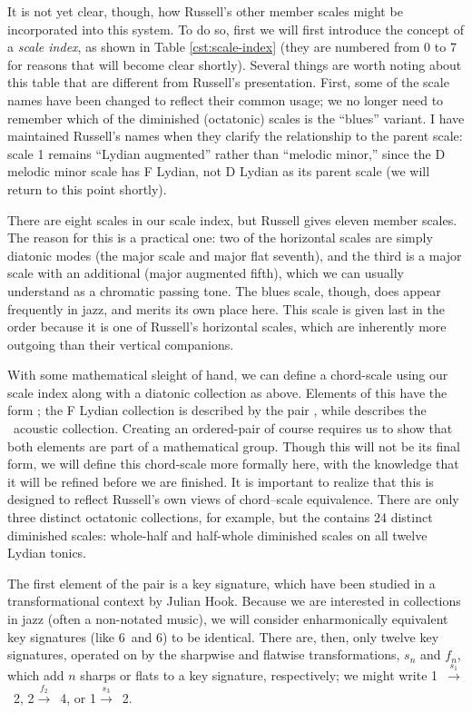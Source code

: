 It is not yet clear, though, how Russell's other member scales might be
incorporated into this system. To do so, first we will first introduce the
concept of a \emph{scale index}, as shown in Table \ref{cst:scale-index} (they
are numbered from 0 to 7 for reasons that will become clear shortly).
Several things are worth noting about this table that are different from
Russell's presentation. First, some of the scale names
have been changed to reflect their common usage; we no longer need to remember
which of the diminished (octatonic) scales is the ``blues'' variant.
I have maintained Russell's names when they clarify the relationship to the
parent scale: scale 1 remains ``Lydian augmented'' rather than ``melodic
minor,'' since the D melodic minor scale has F Lydian, not D Lydian as its
parent scale (we will return to this point shortly).

There are eight scales in our scale index, but Russell gives eleven member
scales. The reason for this is a practical one: two of the horizontal scales
are simply diatonic modes (the major scale and major flat seventh), and the
third is a major scale with an additional \sharp{} (major augmented
fifth), which we can usually understand as a chromatic passing tone. The blues
scale, though, does appear frequently in jazz, and merits its own place
here. This scale is given last in the order because it is one of
Russell's horizontal scales, which are inherently more outgoing than their
vertical companions.

With some mathematical sleight of hand, we can define a chord-scale \gis using
our scale index along with a diatonic collection as above. Elements of this
\gis have the form ;
the F Lydian collection is described by the pair ,
while  describes the \Eflat\ acoustic
collection. Creating an ordered-pair \gis of course requires us to show that
both elements are part of a mathematical group. Though this will not be its
final form, we will define this chord-scale \gis more formally
here, with the knowledge that it will be refined before we are finished. It is
important to realize that this \gis is designed to reflect Russell's own views
of chord--scale equivalence. There are only three distinct octatonic
collections, for example, but the \gis contains 24 distinct diminished scales:
whole-half and half-whole diminished scales on all twelve Lydian tonics.

The first element of the pair is a key signature, which have been studied in a
transformational context by Julian Hook. Because we are interested
in collections in jazz (often a non-notated music), we will consider
enharmonically equivalent key signatures (like 6\sharp\ and 6\kern0.8pt\flat) to be
identical. There are, then, only twelve key signatures, operated on by the
sharpwise and flatwise transformations, $s_n$ and $f_n$, which add $n$ sharps
or flats to a key signature, respectively; we might write \mbox{1\sharp
$\xrightarrow{\ s_1\ }$ 2\sharp}, \mbox{2\flat $\xrightarrow{\ f_2\ }$ 4\flat}, or
\mbox{1\flat $\xrightarrow{\ s_3\ }$ 2\sharp}.

